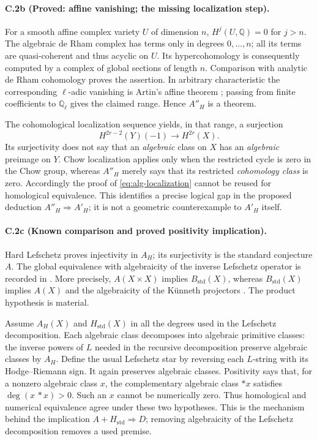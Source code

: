 \paragraph{C.2b (Proved: affine vanishing; the missing localization step).}
For a smooth affine complex variety $U$ of dimension $n$,
$H^j(U,\mathbb Q)=0$ for $j>n$. The algebraic de Rham complex has terms
only in degrees $0,\ldots,n$; all its terms are quasi-coherent and thus
acyclic on $U$. Its hypercohomology is consequently computed by a complex
of global sections of length $n$. Comparison with analytic de Rham
cohomology proves the assertion. In arbitrary characteristic the
corresponding $\ell$-adic vanishing is Artin's affine theorem
\citep[Expos\'e XIV, Corollaire 3.2]{cySGA4XIV}; passing from finite
coefficients to $\mathbb Q_\ell$ gives the claimed range. Hence $A''_H$
is a theorem.

The cohomological localization sequence yields, in that range, a
surjection
\[
 H^{2r-2}(Y)(-1)\longrightarrow H^{2r}(X).
\]
Its surjectivity does not say that an \emph{algebraic} class on $X$ has
an \emph{algebraic} preimage on $Y$. Chow localization applies only when
the restricted cycle is zero in the Chow group, whereas $A''_H$ merely
says that its restricted \emph{cohomology class} is zero. Accordingly
the proof of \eqref{eq:alg-localization} cannot be reused for homological
equivalence. This identifies a precise logical gap in the proposed
deduction $A''_H\Rightarrow A'_H$; it is not a geometric counterexample
to $A'_H$ itself.

\paragraph{C.2c (Known comparison and proved positivity implication).}
Hard Lefschetz proves injectivity in $A_H$; its surjectivity is the
standard conjecture $A$. The global equivalence with algebraicity of
the inverse Lefschetz operator is recorded in
\citet[Corollary 2.14]{cyKleiman1968}. More precisely,
$A(X\times X)$ implies $B_{\mathrm{std}}(X)$, whereas
$B_{\mathrm{std}}(X)$ implies $A(X)$ and the algebraicity of the
K\"unneth projectors
\citep[Theorem 4-1]{cyKleiman1994}. The product hypothesis is material.

Assume $A_H(X)$ and $H_{\mathrm{std}}(X)$ in all the degrees used in the
Lefschetz decomposition. Each algebraic class decomposes into algebraic
primitive classes: the inverse powers of $L$ needed in the recursive
decomposition preserve algebraic classes by $A_H$. Define the usual
Lefschetz star by reversing each $L$-string with its Hodge--Riemann sign.
It again preserves algebraic classes. Positivity says that, for a
nonzero algebraic class $x$, the complementary algebraic class $*x$
satisfies $\deg(x\,*x)>0$. Such an $x$ cannot be numerically zero.
Thus homological and numerical equivalence agree under these two
hypotheses. This is the mechanism behind the implication
$A+H_{\mathrm{std}}\Rightarrow D$; removing algebraicity of the
Lefschetz decomposition removes a used premise.

